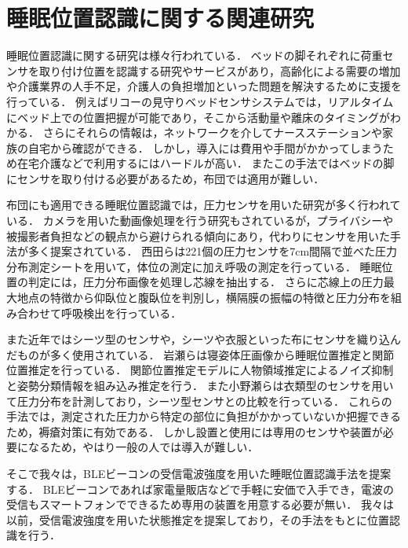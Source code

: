 \section{睡眠位置認識に関する関連研究}
睡眠位置認識に関する研究は様々行われている．
ベッドの脚それぞれに荷重センサを取り付け位置を認識する研究\cite{ML}やサービスがあり，高齢化による需要の増加や介護業界の人手不足，介護人の負担増加といった問題を解決するために支援を行っている．
例えばリコーの見守りベッドセンサシステム\cite{riko}では，リアルタイムにベッド上での位置把握が可能であり，そこから活動量や離床のタイミングがわかる．
さらにそれらの情報は，ネットワークを介してナースステーションや家族の自宅から確認ができる．
しかし，導入には費用や手間がかかってしまうため在宅介護などで利用するにはハードルが高い．
またこの手法ではベッドの脚にセンサを取り付ける必要があるため，布団では適用が難しい．


布団にも適用できる睡眠位置認識では，圧力センサを用いた研究が多く行われている．
カメラを用いた動画像処理を行う研究\cite{Multimodal}もされているが，プライバシーや被撮影者負担などの観点から避けられる傾向にあり，代わりにセンサを用いた手法が多く提案されている．
西田らは221個の圧力センサを7cm間隔で並べた圧力分布測定シートを用いて，体位の測定に加え呼吸の測定を行っている\cite{atu}．
睡眠位置の判定には，圧力分布画像を処理し芯線を抽出する．
さらに芯線上の圧力最大地点の特徴から仰臥位と腹臥位を判別し，横隔膜の振幅の特徴と圧力分布を組み合わせて呼吸検出を行っている．


また近年ではシーツ型のセンサや，シーツや衣服といった布にセンサを織り込んだものが多く使用されている\cite{orimono, seat}．
岩瀬らは寝姿体圧画像から睡眠位置推定と関節位置推定を行っている\cite{kansetu}．
関節位置推定モデルに人物領域推定によるノイズ抑制と姿勢分類情報を組み込み推定を行う．%
また小野瀬らは衣類型のセンサを用いて圧力分布を計測しており，シーツ型センサとの比較を行っている\cite{irui_hikaku}．
これらの手法では，測定された圧力から特定の部位に負担がかかっていないか把握できるため，褥瘡対策に有効である．
しかし設置と使用には専用のセンサや装置が必要になるため，やはり一般の人では導入が難しい．





そこで我々は，BLEビーコンの受信電波強度を用いた睡眠位置認識手法を提案する．
BLEビーコンであれば家電量販店などで手軽に安価で入手でき，電波の受信もスマートフォンでできるため専用の装置を用意する必要が無い．
我々は以前，受信電波強度を用いた状態推定を提案しており，その手法をもとに位置認識を行う．


